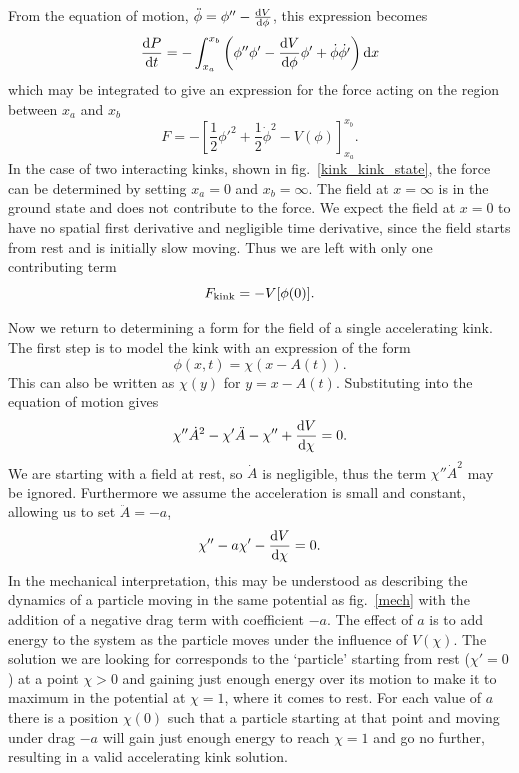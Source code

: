 \documentclass[11pt, oneside]{article}  	%
\numberwithin{equation}{section}
\newcommand{\drv}{\ensuremath{\textup{d}}}
\begin{document}
From the equation of motion, $\ddot{\phi} = \phi'' - \frac{\drv V}{\drv\phi}$, this expression becomes
\begin{equation}
    \frac{\drv P}{\drv t} = - \int_{x_a}^{x_b} \left ( \phi'' \phi' - \frac{\drv V}{\drv\phi} \phi' + \dot{\phi}\dot{\phi'} \right )\drv x
\end{equation}
which may be integrated to give an expression for the force acting on the region between $x_a$ and $x_b$
\begin{equation}\label{force_total}
    F = -\left [ \frac{1}{2} \phi'^2 + \frac{1}{2} \dot{\phi}^2 - V(\phi) \right ]_{x_a}^{x_b}.
\end{equation}
In the case of two interacting kinks, shown in fig.~\ref{kink_kink_state}, the force can be determined by setting $x_a = 0$ and $x_b = \infty$. The field at $ x =\infty$ is in the ground state and does not contribute to the force. We expect the field at $x=0$ to have no spatial first derivative and negligible time derivative, since the field starts from rest and is initially slow moving. Thus we are left with only one contributing term
\begin{equation} \label{force}
    F_\textup{kink} = - V[\phi(0)].
\end{equation}\par
Now we return to determining a form for the field of a single accelerating kink. The first step is to model the kink with an expression of the form
\begin{equation}
    \phi(x,t) = \chi\left( x - A(t)\right).
\end{equation}
This can also be written as $\chi\left( y\right)$ for $y = x-A(t)$. Substituting into the equation of motion gives
\begin{equation}
    \chi '' \dot{A}^2 - \chi'\ddot{A} - \chi '' + \frac{\drv V }{\drv \chi}=0.
\end{equation}
We are starting with a field at rest, so $\dot{A}$ is negligible, thus the term $\chi '' \dot{A}^2$ may be ignored. Furthermore we assume the acceleration is small and constant, allowing us to set $\ddot{A} = -a$,
\begin{equation} \label{acc_kink}
    \chi'' - a\chi' - \frac{\drv V }{\drv \chi}=0.
\end{equation}
In the mechanical interpretation, this may be understood as describing the dynamics of a particle moving in the same potential as fig.~\ref{mech} with the addition of a negative drag term with coefficient $-a$. The effect of $a$ is to add energy to the system as the particle moves under the influence of $V(\chi)$. The solution we are looking for corresponds to the `particle' starting from rest ($\chi' = 0$) at a point $\chi >0$ and gaining just enough energy over its motion to make it to maximum in the potential at $\chi=1$, where it comes to rest. For each value of $a$ there is a position $\chi(0)$ such that a particle starting at that point and moving under drag $-a$ will gain just enough energy to reach $\chi=1$ and go no further, resulting in a valid accelerating kink solution.\par
\end{document}
